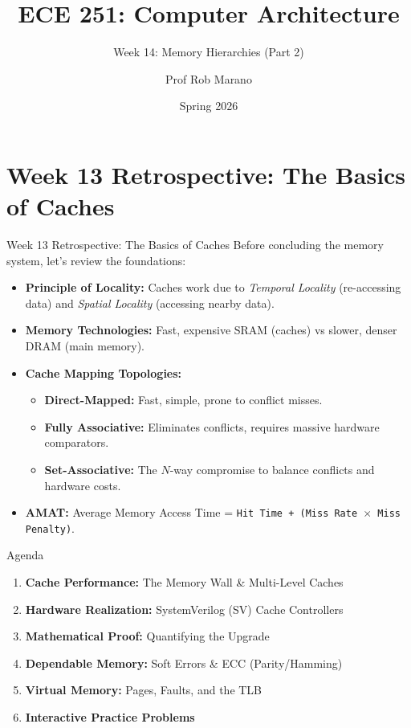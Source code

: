 \documentclass[aspectratio=169]{beamer}
\title{ECE 251: Computer Architecture}
\subtitle{Week 14: Memory Hierarchies (Part 2)}
\author{Prof Rob Marano}
\date{Spring 2026}
\begin{document}
\begin{frame}
  \titlepage
\end{frame}

\section*{Week 13 Retrospective: The Basics of Caches}

\begin{frame}{Week 13 Retrospective: The Basics of Caches}
Before concluding the memory system, let's review the foundations:
\begin{itemize}
    \item \textbf{Principle of Locality:} Caches work due to \textit{Temporal Locality} (re-accessing data) and \textit{Spatial Locality} (accessing nearby data).
    \item \textbf{Memory Technologies:} Fast, expensive SRAM (caches) vs slower, denser DRAM (main memory).
    \item \textbf{Cache Mapping Topologies:} 
    \begin{itemize}
        \item \textbf{Direct-Mapped:} Fast, simple, prone to conflict misses.
        \item \textbf{Fully Associative:} Eliminates conflicts, requires massive hardware comparators.
        \item \textbf{Set-Associative:} The $N$-way compromise to balance conflicts and hardware costs.
    \end{itemize}
    \item \textbf{AMAT:} Average Memory Access Time = \texttt{Hit Time + (Miss Rate $\times$ Miss Penalty)}.
\end{itemize}
\end{frame}

\begin{frame}{Agenda}
\begin{enumerate}
    \item \textbf{Cache Performance:} The Memory Wall \& Multi-Level Caches
    \item \textbf{Hardware Realization:} SystemVerilog (SV) Cache Controllers
    \item \textbf{Mathematical Proof:} Quantifying the Upgrade
    \item \textbf{Dependable Memory:} Soft Errors \& ECC (Parity/Hamming)
    \item \textbf{Virtual Memory:} Pages, Faults, and the TLB
    \item \textbf{Interactive Practice Problems}
\end{enumerate}
\end{frame}
\end{document}
